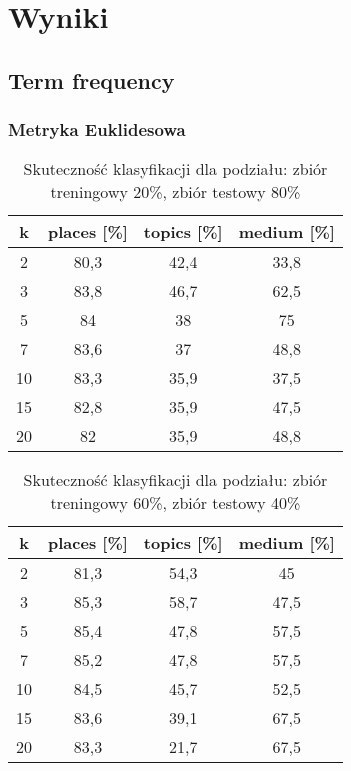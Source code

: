 \documentclass{classrep}
\begin{document}
\section{Wyniki}
\subsection{Term frequency}
\subsubsection{Metryka Euklidesowa}
\begin{table}[H]
	\centering
	\begin{tabular}{c c c c} 
		\hline
		\textbf{k} & \textbf{places [\%]} & \textbf{topics [\%]} &  \textbf{medium [\%]} \\ [0.5ex] 
		\hline
		\hline 
2 & 80,3 & 42,4 & 33,8 \\ 
3 & 83,8 & 46,7 & 62,5 \\ 
5 & 84 & 38 & 75 \\ 
7 & 83,6 & 37 & 48,8 \\ 
10 & 83,3 & 35,9 & 37,5 \\ 
15 & 82,8 & 35,9 & 47,5 \\ 
20 & 82 & 35,9 & 48,8 \\ 
		\hline
	\end{tabular}
	\caption{Skuteczność klasyfikacji dla podziału: zbiór treningowy 20\%, zbiór testowy 80\%}
\end{table}

\begin{table}[H]
	\centering
	\begin{tabular}{c c c c} 
		\hline
		\textbf{k} & \textbf{places [\%]} & \textbf{topics [\%]} &  \textbf{medium [\%]} \\ [0.5ex] 
		\hline
		\hline 
2 & 81,3 & 54,3 & 45 \\ 
3 & 85,3 & 58,7 & 47,5 \\ 
5 & 85,4 & 47,8 & 57,5 \\ 
7 & 85,2 & 47,8 & 57,5 \\ 
10 & 84,5 & 45,7 & 52,5 \\ 
15 & 83,6 & 39,1 & 67,5 \\ 
20 & 83,3 & 21,7 & 67,5 \\ 
		\hline
	\end{tabular}
	\caption{Skuteczność klasyfikacji dla podziału: zbiór treningowy 60\%, zbiór testowy 40\%}
\end{table}
\end{document}
